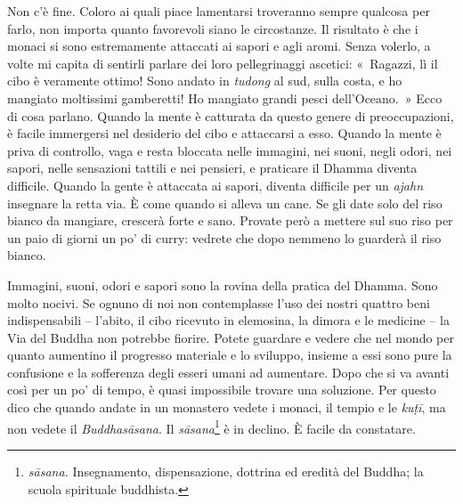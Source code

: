 Non c'è fine. Coloro ai quali piace lamentarsi troveranno sempre
qualcosa per farlo, non importa quanto favorevoli siano le circostanze.
Il risultato è che i monaci si sono estremamente attaccati ai sapori e
agli aromi. Senza volerlo, a volte mi capita di sentirli parlare dei
loro pellegrinaggi ascetici: «~Ragazzi, lì il cibo è veramente ottimo!
Sono andato in \emph{tudong} al sud, sulla costa, e ho mangiato
moltissimi gamberetti! Ho mangiato grandi pesci dell'Oceano.~» Ecco di
cosa parlano. Quando la mente è catturata da questo genere di
preoccupazioni, è facile immergersi nel desiderio del cibo e attaccarsi
a esso. Quando la mente è priva di controllo, vaga e resta bloccata
nelle immagini, nei suoni, negli odori, nei sapori, nelle sensazioni
tattili e nei pensieri, e praticare il Dhamma diventa difficile. Quando
la gente è attaccata ai sapori, diventa difficile per un \emph{ajahn}
insegnare la retta via. È come quando si alleva un cane. Se gli date
solo del riso bianco da mangiare, crescerà forte e sano. Provate però a
mettere sul suo riso per un paio di giorni un po' di curry: vedrete che
dopo nemmeno lo guarderà il riso bianco.

Immagini, suoni, odori e sapori sono la rovina della pratica del Dhamma.
Sono molto nocivi. Se ognuno di noi non contemplasse l'uso dei nostri
quattro beni indispensabili -- l'abito, il cibo ricevuto in elemosina,
la dimora e le medicine -- la Via del Buddha non potrebbe fiorire.
Potete guardare e vedere che nel mondo per quanto aumentino il progresso
materiale e lo sviluppo, insieme a essi sono pure la confusione e la
sofferenza degli esseri umani ad aumentare. Dopo che si va avanti così
per un po' di tempo, è quasi impossibile trovare una soluzione. Per
questo dico che quando andate in un monastero vedete i monaci, il tempio
e le \emph{kuṭī}, ma non vedete il \emph{Buddhasāsana}. Il
\emph{sāsana}\footnote{\emph{sāsana.} Insegnamento, dispensazione,
  dottrina ed eredità del Buddha; la scuola spirituale buddhista.} è in
declino. È facile da constatare.

